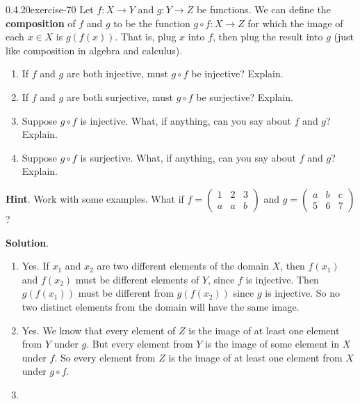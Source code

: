 \documentclass[twoside,11pt,]{book}
\newcommand{\terminology}[1]{\textbf{#1}}
\numberwithin{equation}{chapter}
\newcommand{\twoline}[2]{\begin{pmatrix}#1 \\ #2 \end{pmatrix}}
\newcommand{\amp}{&}
\begin{document}
\begin{divisionsolution}{0.4.20}{}{exercise-70}%
\hypertarget{p-1124}{}%
Let \(f:X \to Y\) and \(g:Y \to Z\) be functions. We can define the \terminology{composition}  of \(f\) and \(g\) to be the function \(g\circ f:X \to Z\) for which the image of each \(x \in X\) is \(g(f(x))\). That is, plug \(x\) into \(f\), then plug the result into \(g\) (just like composition in algebra and calculus).\leavevmode%
\begin{enumerate}[label=(\alph*)]
\item\hypertarget{li-909}{}\hypertarget{p-1125}{}%
If \(f\) and \(g\) are both injective, must \(g\circ f\) be injective? Explain.%
\item\hypertarget{li-910}{}\hypertarget{p-1126}{}%
If \(f\) and \(g\) are both surjective, must \(g\circ f\) be surjective? Explain.%
\item\hypertarget{li-911}{}\hypertarget{p-1127}{}%
Suppose \(g\circ f\) is injective. What, if anything, can you say about \(f\) and \(g\)? Explain.%
\item\hypertarget{li-912}{}\hypertarget{p-1128}{}%
Suppose \(g\circ f\) is surjective. What, if anything, can you say about \(f\) and \(g\)? Explain.%
\end{enumerate}
%
\par\smallskip%
\noindent\textbf{Hint}.\quad%
\hypertarget{p-1129}{}%
Work with some examples. What if \(f = \twoline{1\amp 2 \amp 3}{a \amp a \amp b}\) and \(g = \twoline{a\amp b \amp c}{5 \amp 6 \amp 7}\)?%
\par\smallskip%
\noindent\textbf{Solution}.\quad%
\hypertarget{p-1130}{}%
\leavevmode%
\begin{enumerate}[label=(\alph*)]
\item\hypertarget{li-913}{}\hypertarget{p-1131}{}%
Yes. If \(x_1\) and \(x_2\) are two different elements of the domain \(X\), then \(f(x_1)\) and \(f(x_2)\) must be different elements of \(Y\), since \(f\) is injective. Then \(g(f(x_1))\) must be different from \(g(f(x_2))\) since \(g\) is injective. So no two distinct elements from the domain will have the same image.%
\item\hypertarget{li-914}{}\hypertarget{p-1132}{}%
Yes. We know that every element of \(Z\) is the image of at least one element from \(Y\) under \(g\). But every element from \(Y\) is the image of some element in \(X\) under \(f\). So every element from \(Z\) is the image of at least one element from \(X\) under \(g\circ f\).%
\item\hypertarget{li-915}{}\hypertarget{p-1133}{}%

\end{enumerate}
\end{divisionsolution}
\end{document}
